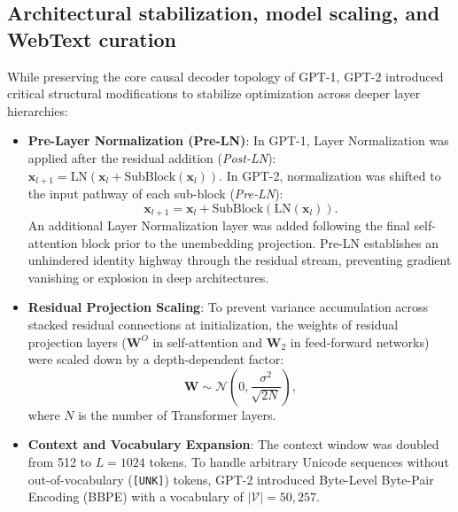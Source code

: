 \documentclass[../../../main.tex]{subfiles}
\begin{document}
\subsection{Architectural stabilization, model scaling, and WebText curation}
\label{subsec:gpt2_setup}

While preserving the core causal decoder topology of GPT-1, GPT-2 introduced critical structural modifications to stabilize optimization across deeper layer hierarchies:
\begin{itemize}
    \item \textbf{Pre-Layer Normalization (Pre-LN)}: In GPT-1, Layer Normalization was applied after the residual addition (\emph{Post-LN}): $\mathbf{x}_{l+1} = \text{LN}(\mathbf{x}_l + \text{SubBlock}(\mathbf{x}_l))$. In GPT-2, normalization was shifted to the input pathway of each sub-block (\emph{Pre-LN}):
    \begin{equation}
    \mathbf{x}_{l+1} = \mathbf{x}_l + \text{SubBlock}(\text{LN}(\mathbf{x}_l)).
    \label{eq:pre_layer_norm}
    \end{equation}
    An additional Layer Normalization layer was added following the final self-attention block prior to the unembedding projection. Pre-LN establishes an unhindered identity highway through the residual stream, preventing gradient vanishing or explosion in deep architectures.
    
    \item \textbf{Residual Projection Scaling}: To prevent variance accumulation across stacked residual connections at initialization, the weights of residual projection layers ($\mathbf{W}^O$ in self-attention and $\mathbf{W}_2$ in feed-forward networks) were scaled down by a depth-dependent factor:
    \begin{equation}
    \mathbf{W} \sim \mathcal{N}\left(0, \frac{\sigma^2}{\sqrt{2N}}\right),
    \label{eq:residual_scaling}
    \end{equation}
    where $N$ is the number of Transformer layers.
    
    \item \textbf{Context and Vocabulary Expansion}: The context window was doubled from 512 to $L = 1024$ tokens. To handle arbitrary Unicode sequences without out-of-vocabulary (\texttt{[UNK]}) tokens, GPT-2 introduced Byte-Level Byte-Pair Encoding (BBPE) with a vocabulary of $|\mathcal{V}| = 50,257$.
\end{itemize}
\end{document}
